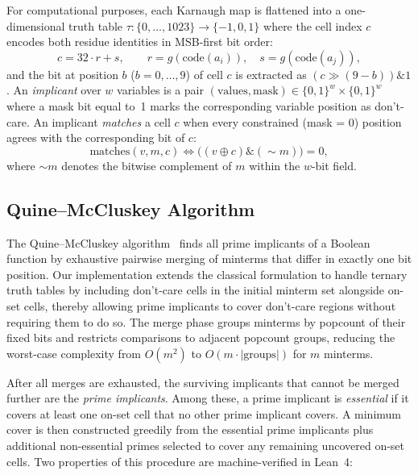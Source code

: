 For computational purposes, each Karnaugh map is flattened into a one-dimensional
truth table $\tau : \{0, \ldots, 1023\} \to \{-1, 0, 1\}$ where the cell index
$c$ encodes both residue identities in MSB-first bit order:
\begin{equation}
	c = 32 \cdot r + s, \qquad r = g(\mathrm{code}(a_i)), \quad s = g(\mathrm{code}(a_j)),
	\label{eq:cell-index}
\end{equation}
and the bit at position $b$ ($b = 0, \ldots, 9$) of cell $c$ is extracted as
$(c \gg (9 - b)) \mathbin{\&} 1$.  An \emph{implicant} over $w$ variables is a
pair $(\mathrm{values}, \mathrm{mask}) \in \{0,1\}^w \times \{0,1\}^w$ where a
mask bit equal to~1 marks the corresponding variable position as don't-care.
An implicant \emph{matches} a cell $c$ when every constrained (mask = 0)
position agrees with the corresponding bit of $c$:
\begin{equation}
	\mathrm{matches}(v, m, c) \iff
	\bigl((v \oplus c) \mathbin{\&} (\sim m)\bigr) = 0,
	\label{eq:implicant-match}
\end{equation}
where $\sim m$ denotes the bitwise complement of $m$ within the $w$-bit field.

\subsection{Quine--McCluskey Algorithm}
\label{sec:qm-algorithm}

The Quine--McCluskey algorithm~\cite{quine1952,mccluskey1956} finds all prime
implicants of a Boolean function by exhaustive pairwise merging of minterms
that differ in exactly one bit position.  Our implementation extends the
classical formulation to handle ternary truth tables by including don't-care
cells in the initial minterm set alongside on-set cells, thereby allowing
prime implicants to cover don't-care regions without requiring them to do so.
The merge phase groups minterms by popcount of their fixed bits and restricts
comparisons to adjacent popcount groups, reducing the worst-case complexity
from $O(m^2)$ to $O(m \cdot |\text{groups}|)$ for $m$ minterms.

After all merges are exhausted, the surviving implicants that cannot be merged
further are the \emph{prime implicants}.  Among these, a prime implicant is
\emph{essential} if it covers at least one on-set cell that no other prime
implicant covers.  A minimum cover is then constructed greedily from the
essential prime implicants plus additional non-essential primes selected to
cover any remaining uncovered on-set cells.  Two properties of this procedure
are machine-verified in Lean~4:

